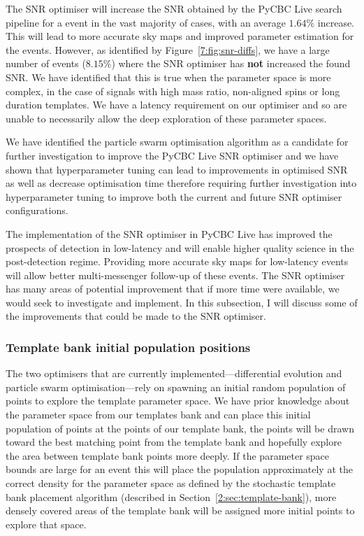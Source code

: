 The SNR optimiser will increase the SNR obtained by the PyCBC Live search pipeline for a \gwadj event in the vast majority of cases, with an average $1.64\%$ increase. This will lead to more accurate sky maps and improved parameter estimation for the \gwadj events. However, as identified by Figure~\ref{7:fig:snr-diffs}, we have a large number of events ($8.15\%$) where the SNR optimiser has \textbf{not} increased the found SNR. We have identified that this is true when the parameter space is more complex, in the case of signals with high mass ratio, non-aligned spins or long duration templates. We have a latency requirement on our optimiser and so are unable to necessarily allow the deep exploration of these parameter spaces.


We have identified the particle swarm optimisation algorithm as a candidate for further investigation to improve the PyCBC Live SNR optimiser and we have shown that hyperparameter tuning can lead to improvements in optimised SNR as well as decrease optimisation time therefore requiring further investigation into hyperparameter tuning to improve both the current and future SNR optimiser configurations.

The implementation of the SNR optimiser in PyCBC Live has improved the prospects of \gwadj detection in low-latency and will enable higher quality science in the post-detection regime. Providing more accurate sky maps for low-latency events will allow better multi-messenger follow-up of these events. The SNR optimiser has many areas of potential improvement that if more time were available, we would seek to investigate and implement. In this subsection, I will discuss some of the improvements that could be made to the SNR optimiser.

\subsubsection{Template bank initial population positions}

% 

The two optimisers that are currently implemented---differential evolution and particle swarm optimisation---rely on spawning an initial random population of points to explore the template parameter space. We have prior knowledge about the parameter space from our templates bank and can place this initial population of points at the points of our template bank, the points will be drawn toward the best matching point from the template bank and hopefully explore the area between template bank points more deeply. If the parameter space bounds are large for an event this will place the population approximately at the correct density for the parameter space as defined by the stochastic template bank placement algorithm (described in Section~\ref{2:sec:template-bank}), more densely covered areas of the template bank will be assigned more initial points to explore that space.

